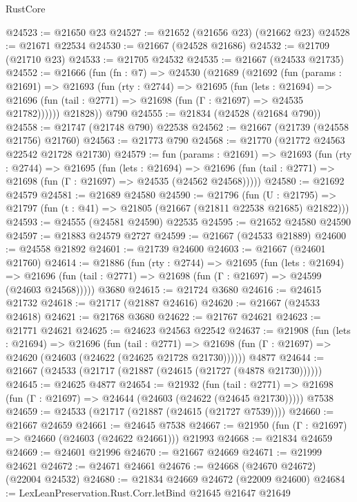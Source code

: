 \begin{lexlean}{RustCore}
\begin{coremodule}
@24523 := @21650 @23
@24527 := @21652 (@21656 @23) (@21662 @23)
@24528 := @21671 @22534
@24530 := @21667 (@24528 @21686)
@24532 := @21709 (@21710 @23)
@24533 := @21705 @24532
@24535 := @21667 (@24533 @21735)
@24552 := @21666
    (fun (fn : @7) =>
    @24530
      (@21689
        (@21692
          (fun (params : @21691) =>
          @21693
            (fun (rty : @2744) =>
            @21695
              (fun (lets : @21694) =>
              @21696 (fun (tail : @2771) => @21698 (fun (Γ : @21697) => @24535 @21782))))))
        @21828))
    @790
@24555 := @21834 (@24528 (@21684 @790))
@24558 := @21747 (@21748 @790) @22538
@24562 := @21667 (@21739 (@24558 @21756) @21760)
@24563 := @21773 @790
@24568 := @21770 (@21772 @24563 @22542 @21728 @21730)
@24579 := fun (params : @21691) =>
  @21693
    (fun (rty : @2744) =>
    @21695
      (fun (lets : @21694) =>
      @21696 (fun (tail : @2771) => @21698 (fun (Γ : @21697) => @24535 (@24562 @24568)))))
@24580 := @21692 @24579
@24581 := @21689 @24580
@24590 := @21796
    (fun (U : @21795) => @21797 (fun (t : @41) => @21805 (@21667 (@21811 @22538 @21685) @21822)))
@24593 := @24555 (@24581 @24590) @22535
@24595 := @21652 @24580 @24590
@24597 := @21883 @24579 @2727
@24599 := @21667 (@24533 @21889)
@24600 := @24558 @21892
@24601 := @21739 @24600
@24603 := @21667 (@24601 @21760)
@24614 := @21886
    (fun (rty : @2744) =>
    @21695
      (fun (lets : @21694) =>
      @21696 (fun (tail : @2771) => @21698 (fun (Γ : @21697) => @24599 (@24603 @24568)))))
    @3680
@24615 := @21724 @3680
@24616 := @24615 @21732
@24618 := @21717 (@21887 @24616)
@24620 := @21667 (@24533 @24618)
@24621 := @21768 @3680
@24622 := @21767 @24621
@24623 := @21771 @24621
@24625 := @24623 @24563 @22542
@24637 := @21908
    (fun (lets : @21694) =>
    @21696
      (fun (tail : @2771) =>
      @21698 (fun (Γ : @21697) => @24620 (@24603 (@24622 (@24625 @21728 @21730))))))
    @4877
@24644 := @21667 (@24533 (@21717 (@21887 (@24615 (@21727 (@4878 @21730))))))
@24645 := @24625 @4877
@24654 := @21932
    (fun (tail : @2771) => @21698 (fun (Γ : @21697) => @24644 (@24603 (@24622 (@24645 @21730)))))
    @7538
@24659 := @24533 (@21717 (@21887 (@24615 (@21727 @7539))))
@24660 := @21667 @24659
@24661 := @24645 @7538
@24667 := @21950 (fun (Γ : @21697) => @24660 (@24603 (@24622 @24661))) @21993
@24668 := @21834 @24659
@24669 := @24601 @21996
@24670 := @21667 @24669
@24671 := @21999 @24621
@24672 := @24671 @24661
@24676 := @24668 (@24670 @24672) (@22004 @24532)
@24680 := @21834 @24669 @24672 (@22009 @24600)
@24684 := LexLeanPreservation.Rust.Corr.letBind @21645 @21647 @21649

\end{coremodule}
\end{lexlean}

